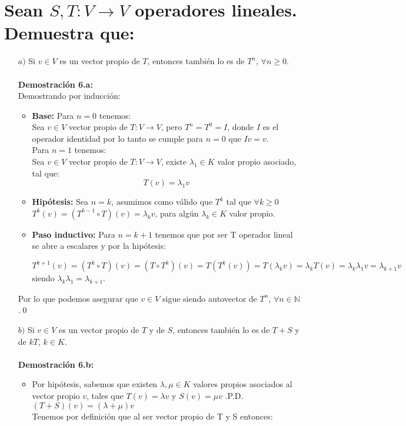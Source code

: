 \section{Sean $S, T: V \longrightarrow V$ operadores lineales. Demuestra que:}
\begin{itemize}
    \item[$a)$] Si $v\in V$ es un vector propio de $T$, entonces también lo es de $T^n$, $\forall n \geq 0$.\\\\
    \textbf{Demostraci\'on 6.a:}\\
    Demostrando por inducci\'on:
    \begin{itemize}
        \item \textbf{Base:} Para $n=0$ tenemos:\\
    Sea $v \in V  $ vector propio de $T:V\longrightarrow V$, pero
    $T^n=T^0=I$, donde $I$ es el operador identidad por lo tanto se cumple para $n=0$ que $Iv=v$.\\
    
    Para $n=1$ tenemos:\\
    Sea $v \in V  $ vector propio de $T:V\longrightarrow V$, existe $\lambda_1\in K$ valor propio asociado, tal que:
    \[T(v)=\lambda_1 v\]
    
    \item \textbf{Hip\'otesis:} Sea $n=k$, asumimos como v\'alido que
    $T^k$ tal que $\forall k\geq0$\\
    $T^k(v)=(T^{k-1}\circ T)(v)=\lambda_{k}v$, para alg\'un $\lambda_k\in K$ valor propio.
    
    \item \textbf{Paso inductivo:} Para $n=k+1$ tenemos que por ser T operador lineal se abre a escalares y por la hip\'otesis:
    
    $$T^{k+1}(v)=(T^{k}\circ T)(v)=(T\circ T^{k})(v) =T(T^k(v))=T(\lambda_kv)= \lambda_{k}T(v)=\lambda_k\lambda_1 v=\lambda_{k+1}v$$
    siendo $\lambda_k\lambda_1=\lambda_{k+1}$.
    \end{itemize}
    Por lo que podemos asegurar que $v\in V$ sigue siendo autovector de $T^n$, $\forall n\in\mathbb{N}$.\qed
   
    
    
    
    


    \item[$b)$] Si $v\in V$ es un vector propio de $T$ y de $S$, entonces también lo es de $T + S$ y de $kT$, $k\in K $.\\\\
    \textbf{Demostraci\'on 6.b:}\\
    \begin{itemize}
        \item Por hip\'otesis, sabemos que existen $\lambda, \mu\in  K$ valores propios asociados al vector propio $v$, tales que $T(v)=\lambda v$ y $S(v)=\mu v$ .P.D. $(T+S)(v)=(\lambda+\mu)v$\\
    Tenemos por definici\'on que al ser vector propio de T y S entonces:\\
    

\end{itemize}
\end{itemize}
